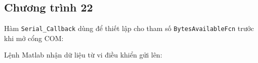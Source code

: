 \subsection*{Chương trình 22}


Hàm \verb|Serial_Callback| dùng để thiết lập cho tham số \verb|BytesAvailableFcn| trước khi mở cổng COM:


Lệnh Matlab nhận dữ liệu từ vi điều khiển gửi lên:
